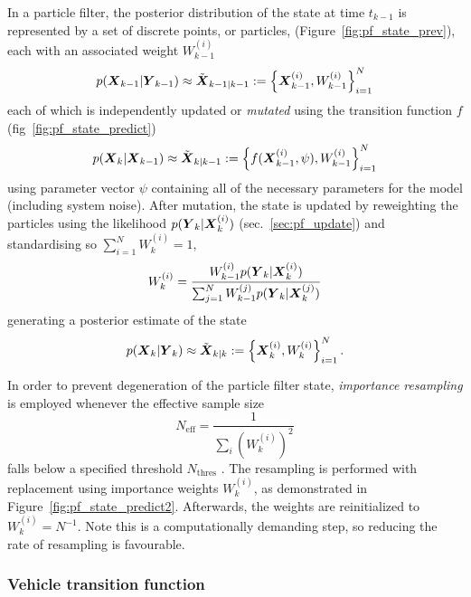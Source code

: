 In a particle filter, the posterior distribution of the state at time $t_{k-1}$
is represented by a set of discrete points, or particles, (Figure~\ref{fig:pf_state_prev}),
each with an associated weight $W_{k-1}^{(i)}$
\begin{equation}
p(\mbox{$\boldsymbol{X}$}_{k-1} | \mbox{$\boldsymbol{Y}$}_{k-1}) \approx \tilde{\mbox{$\boldsymbol{X}$}}_{k-1|k-1} 
:= \left\{\mbox{$\boldsymbol{X}$}_{k-1}^{(i)}, W_{k-1}^{(i)}\right\}_{i=1}^N
\end{equation}
each of which is independently updated or \emph{mutated} using the transition function $f$ (fig~\ref{fig:pf_state_predict})
\begin{equation}
p(\mbox{$\boldsymbol{X}$}_k | \mbox{$\boldsymbol{X}$}_{k-1}) \approx \tilde{\mbox{$\boldsymbol{X}$}}_{k|k-1} := 
\left\{f(\mbox{$\boldsymbol{X}$}_{k-1}^{(i)}, \psi), W_{k-1}^{(i)}\right\}_{i=1}^N
\end{equation}
using parameter vector $\psi$ containing all of the necessary parameters
for the model (including system noise).
After mutation, 
the state is updated by reweighting the particles using the likelihood $p(\mbox{$\boldsymbol{Y}$}_k | \mbox{$\boldsymbol{X}$}_k^{(i)})$ 
(sec.~\ref{sec:pf_update}) and standardising so $\sum_{i=1}^N W_k^{(i)} = 1$,
\begin{equation*}
W_k^{(i)} = \frac{W_{k-1}^{(i)} p(\mbox{$\boldsymbol{Y}$}_k | \mbox{$\boldsymbol{X}$}_k^{(i)})}{
    \sum_{j=1}^N W_{k-1}^{(j)} p(\mbox{$\boldsymbol{Y}$}_k | \mbox{$\boldsymbol{X}$}_k^{(j)})
}
\end{equation*}
generating a posterior estimate of the state
\begin{equation}
p(\mbox{$\boldsymbol{X}$}_k | \mbox{$\boldsymbol{Y}$}_k) \approx \tilde{\mbox{$\boldsymbol{X}$}}_{k|k} := 
\left\{\mbox{$\boldsymbol{X}$}_{k}^{(i)}, W_{k}^{(i)}\right\}_{i=1}^N.
\end{equation}

In order to prevent degeneration of the particle filter state,
\emph{importance resampling} is employed whenever the 
effective sample size 
\begin{equation}
\label{eq:neff}
N_{\text{eff}} = \frac{1}{\sum_i (W_k^{(i)})^2}
\end{equation}
falls below a specified threshold $N_{\text{thres}}$
\citep{}.
The resampling is performed with replacement using importance weights $W_k^{(i)}$,
as demonstrated in Figure~\ref{fig:pf_state_predict2}.
Afterwards, the weights are reinitialized to $W_k^{(i)} = N^{-1}$.
Note this is a computationally demanding step,
so reducing the rate of resampling is favourable.



\subsubsection{Vehicle transition function}
\label{sec:pf_prediction}

